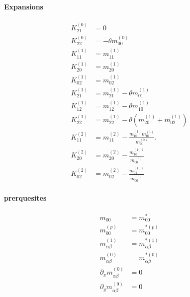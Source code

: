 \documentclass{article}
\begin{document}
  \paragraph{Expansions}
  \begin{align}
      K_{21}^{(0)} & = 0 \label{E1}\tag{E1}\\
      K_{22}^{(0)} & = -\theta m_{00}^{(0)}\label{E2}\tag{E2}\\
      K_{11}^{(1)} & = m_{11}^{(1)} \label{E3}\tag{E3}\\
      K_{20}^{(1)} & = m_{20}^{(1)} \label{E4}\tag{E4}\\
      K_{02}^{(1)} & = m_{02}^{(1)} \label{E5}\tag{E5}\\
      K_{21}^{(1)} & = m_{21}^{(1)} - \theta m_{01}^{(1)} \label{E6}\tag{E6}\\
      K_{12}^{(1)} & = m_{12}^{(1)} - \theta m_{10}^{(1)} \label{E7}\tag{E7}\\
      K_{22}^{(1)} & = m_{22}^{(1)} - \theta (m_{20}^{(1)} + m_{02}^{(1)}) \label{E8}\tag{E8}\\
      K_{11}^{(2)} & = m_{11}^{(2)} - \frac{ m_{10}^{(1)}m_{01}^{(1)}}{m_{00}^{(0)}}. \label{E9}\tag{E9}\\
      K_{20}^{(2)} & = m_{20}^{(2)} - \frac{ m_{10}^{(1)2}}{m_{00}^{(0)}} \label{E10}\tag{E10}\\
      K_{02}^{(2)} & = m_{02}^{(2)} - \frac{ m_{01}^{(1)2}}{m_{00}^{(0)}} \label{E11}\tag{E11}
  \end{align}

  \paragraph{prerquesites}
  \begin{align}
    m_{00} &= m_{00}^*  \label{P1}\tag{P1}\\
    m_{00}^{(p)} &= m_{00}^{*(p)} \label{P2}\tag{P2} \\
    m_{\alpha\beta}^{(1)} &= m_{\alpha\beta}^{*(1)} \label{P3}\tag{P3} \\
    m_{\alpha\beta}^{(0)} &= m_{\alpha\beta}^{*(0)} \label{P4}\tag{P4} \\
    \partial_x m_{\alpha\beta}^{(0)} &= 0  \label{P5}\tag{P5}\\
    \partial_y m_{\alpha\beta}^{(0)} &= 0  \label{P6}\tag{P6}
  \end{align}
\end{document}
